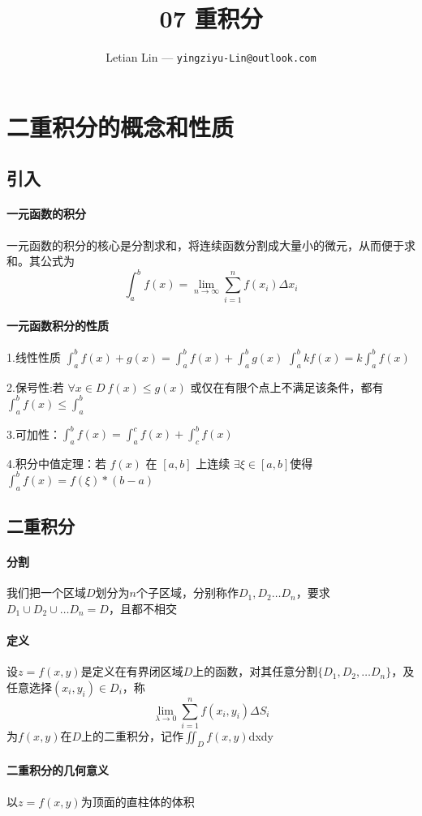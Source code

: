 \documentclass[UTF8]{ctexart}
\title{
	07 重积分
}
\author{
	Letian Lin --- \texttt{yingziyu-Lin@outlook.com}
}
\begin{document}
\maketitle
\tableofcontents
\newpage
\section{二重积分的概念和性质}
\subsection{引入}
\paragraph*{一元函数的积分} 一元函数的积分的核心是分割求和，将连续函数分割成大量小的微元，从而便于求和。其公式为$$\int_a^b f(x) = \lim_{n\to\infty}\sum_{i=1}^n f(x_i) \Delta x_i$$
\paragraph*{一元函数积分的性质}

1.线性性质 $\int_a^b f(x)+g(x) = \int_a^b f(x) + \int_a^b g(x)$
          $\int_a^b kf(x)=k\int_a^bf(x)$

2.保号性:若 $\forall x \in D\ f(x)\leq g(x)$ 或仅在有限个点上不满足该条件，都有 $\int_a^b f(x) \leq \int_a^b$

3.可加性：$\int_a^b f(x)=\int_a^c f(x) + \int_c^b f(x)$

4.积分中值定理：若 $f(x)$ 在 $[a,b]$ 上连续 $\exists \xi \in [a,b]$使得 $\int_a^b f(x) = f(\xi)*(b-a)$

\subsection{二重积分}
\paragraph{分割} 我们把一个区域$D$划分为$n$个子区域，分别称作$D_1,D_2\dots D_n$，要求$D_1 \cup D_2 \cup \dots D_n = D$，且都不相交
\paragraph{定义} 设$z=f(x,y)$是定义在有界闭区域$D$上的函数，对其任意分割$\{D_1,D_2,\dots D_n\}$，及任意选择$(x_i,y_i) \in D_i$，称$$\lim_{\lambda\to 0}\sum_{i=1}^{n}f(x_i,y_i)\Delta S_i$$为$f(x,y)$在$D$上的二重积分，记作$\iint_D f(x,y)$dxdy
\paragraph{二重积分的几何意义} 以$z=f(x,y)$为顶面的直柱体的体积
\end{document}
